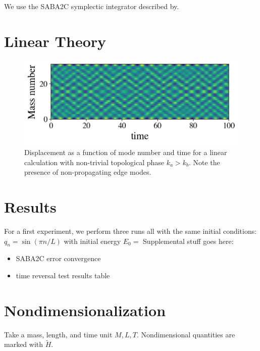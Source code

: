 \documentclass[%
 amsmath,amssymb,
 aps,
 prl,
 twocolumn,
]{revtex4-2}
\begin{document}
We use the SABA2C symplectic integrator described by\cite{2019Chaos..29b3132P}.
\section{\label{sec:methods}Linear Theory}
\begin{figure}
    \centering
    \includegraphics[width=\columnwidth]{ssh_linear_displacement_vs_time.png}
    \caption{Displacement as a function of mode number and time for a linear calculation with non-trivial topological phase $k_a > k_b$. Note the presence of non-propagating edge modes.}
    \label{fig:linear_displacement}
\end{figure}
\section{\label{sec:resuts}Results}
For a first experiment, we perform three runs all with the same initial conditions: $q_n = \sin(\pi n/L)$ with initial energy $E_0 = $
\appendix
Supplemental stuff goes here:
\begin{itemize}
    \item SABA2C error convergence
    \item time reversal test results table
\end{itemize}

\section{Nondimensionalization}
Take a mass, length, and time unit $M, L, T$.
Nondimensional quantities are marked with $\tilde{H}$.
\end{document}
